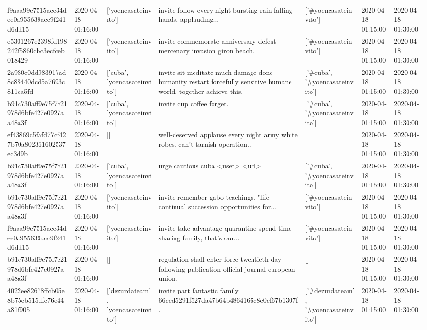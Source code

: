 \begin{tabular}{lllllll}
f9aaa99e7515ace34dee0a955639acc9f241d6dd15 & 2020-04-18 01:16:00 & ['yoencasateinvito'] & invite follow every night bursting rain falling hands, applauding... & ['#yoencasateinvito'] & 2020-04-18 01:15:00 & 2020-04-18 01:30:00 \\
e5301267e2398fd198242f5860cbc3ecfceb018429 & 2020-04-18 01:16:00 & ['yoencasateinvito'] & invite commemorate anniversary defeat mercenary invasion giron beach. & ['#yoencasateinvito'] & 2020-04-18 01:15:00 & 2020-04-18 01:30:00 \\
2a980e0dd983917ad8c88440dcd5a7693c811ca5fd & 2020-04-18 01:16:00 & ['cuba', 'yoencasateinvito'] & invite sit meditate much damage done humanity restart forcefully sensitive humane world. together achieve this. & ['#cuba', '#yoencasateinvito'] & 2020-04-18 01:15:00 & 2020-04-18 01:30:00 \\
b91c730aff9e75f7c21978d6bfe427e0927aa48a3f & 2020-04-18 01:16:00 & ['cuba', 'yoencasateinvito'] & invite cup coffee forget. & ['#cuba', '#yoencasateinvito'] & 2020-04-18 01:15:00 & 2020-04-18 01:30:00 \\
ef43869c5fafd77cf427b70a802361602537ec3d9b & 2020-04-18 01:16:00 & [] & well-deserved applause every night army white robes, can't tarnish operation... & [] & 2020-04-18 01:15:00 & 2020-04-18 01:30:00 \\
b91c730aff9e75f7c21978d6bfe427e0927aa48a3f & 2020-04-18 01:16:00 & ['cuba', 'yoencasateinvito'] & urge cautious cuba <user> <url> & ['#cuba', '#yoencasateinvito'] & 2020-04-18 01:15:00 & 2020-04-18 01:30:00 \\
b91c730aff9e75f7c21978d6bfe427e0927aa48a3f & 2020-04-18 01:16:00 & ['yoencasateinvito'] & invite remember gabo teachings. "life continual succession opportunities for... & ['#yoencasateinvito'] & 2020-04-18 01:15:00 & 2020-04-18 01:30:00 \\
f9aaa99e7515ace34dee0a955639acc9f241d6dd15 & 2020-04-18 01:16:00 & ['yoencasateinvito'] & invite take advantage quarantine spend time sharing family, that's our... & ['#yoencasateinvito'] & 2020-04-18 01:15:00 & 2020-04-18 01:30:00 \\
b91c730aff9e75f7c21978d6bfe427e0927aa48a3f & 2020-04-18 01:16:00 & [] & regulation shall enter force twentieth day following publication official journal european union. & [] & 2020-04-18 01:15:00 & 2020-04-18 01:30:00 \\
4022ee82678ffcb05e8b75eb515dfc76e44a81f905 & 2020-04-18 01:16:00 & ['dezurdateam', 'yoencasateinvito'] & invite part fantastic family 66ced5291f527da47b64b4864166c8e0cf67b1307f. & ['#dezurdateam', '#yoencasateinvito'] & 2020-04-18 01:15:00 & 2020-04-18 01:30:00 \\

\end{tabular}
